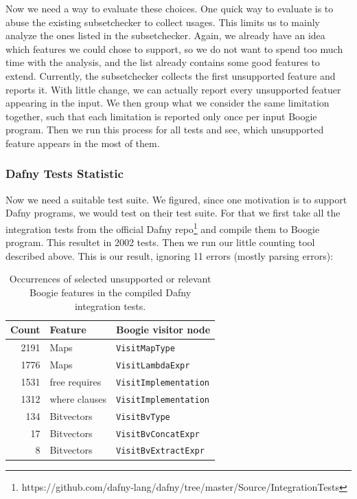 \documentclass[11pt]{article}
\begin{document}
Now we need a way to evaluate these choices.
One quick way to evaluate is to abuse the existing subsetchecker to collect usages.
This limits us to mainly analyze the ones listed in the subsetchecker.
Again, we already have an idea which features we could chose to support,
so we do not want to spend too much time with the analysis,
and the list already contains some good features to extend.
Currently, the subsetchecker collects the first unsupported feature and reports it.
With little change, we can actually report every unsupported featuer appearing in the input.
We then group what we consider the same limitation together, such that each limitation is reported only once per input Boogie program.
Then we run this process for all tests and see, which unsupported feature appears in the most of them.


\subsubsection{Dafny Tests Statistic}

Now we need a suitable test suite.
We figured, since one motivation is to support Dafny programs, we would test on their test suite.
For that we first take all the integration tests from the official Dafny repo\footnote{https://github.com/dafny-lang/dafny/tree/master/Source/IntegrationTests} and compile them to Boogie program.
This resultet in 2002 tests.
Then we run our little counting tool described above.
This is our result, ignoring 11 errors (mostly parsing errors):
\begin{table}[t]
  \centering
  \begin{tabular}{r l l}
    \hline
    Count & Feature & Boogie visitor node \\
    \hline
    2191 & Maps & \texttt{VisitMapType} \\
    1776 & Maps & \texttt{VisitLambdaExpr} \\
    1531 & free requires & \texttt{VisitImplementation} \\
    1312 & where clauses & \texttt{VisitImplementation} \\
     134 & Bitvectors & \texttt{VisitBvType} \\
      17 & Bitvectors & \texttt{VisitBvConcatExpr} \\
       8 & Bitvectors & \texttt{VisitBvExtractExpr} \\
    \hline
  \end{tabular}
  \caption{Occurrences of selected unsupported or relevant Boogie features in the compiled Dafny integration tests.}
  \label{tab:dafny-feature-counts}
\end{table}
\end{document}
